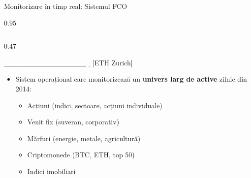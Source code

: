 \documentclass[9pt, aspectratio=169, t]{beamer}
\begin{document}
\begin{frame}{Monitorizare în timp real: Sistemul FCO}
    \begin{cminipage}{0.95\textwidth}
    {\footnotesize
    \begin{columns}[T]
        \begin{column}{0.47\textwidth}
            \begin{block}{\href{https://www.er.ethz.ch/financial-crisis-observatory.html}{\textcolor{white}{Financial Crisis Observatory}} {\scriptsize[ETH Zurich]}}
                \begin{itemize}\setlength{\itemsep}{1pt}
                    \item Sistem operațional care monitorizează un \textbf{univers larg de active} zilnic din 2014:
                    \begin{itemize}\setlength{\itemsep}{0pt}
                        \item Acțiuni (indici, sectoare, acțiuni individuale)
                        \item Venit fix (suveran, corporativ)
                        \item Mărfuri (energie, metale, agricultură)
                        \item Criptomonede (BTC, ETH, top 50)
                        \item Indici imobiliari
                    \end{itemize}
                \end{itemize}
            \end{block}


\end{column}
\end{columns}}
\end{cminipage}
\end{frame}
\end{document}
